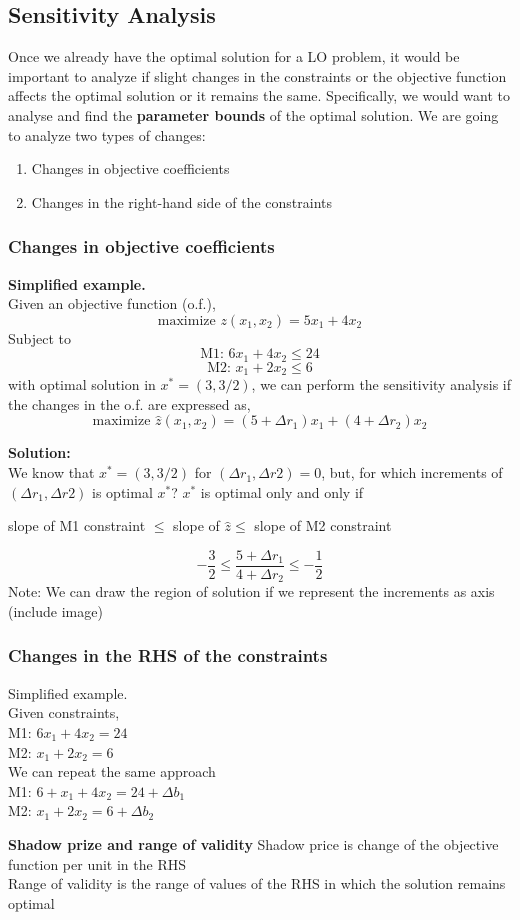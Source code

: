 \subsection{Sensitivity Analysis}
Once we already have the optimal solution for a LO problem, it would be important to analyze if slight changes in the constraints or the objective function
affects the optimal solution or it remains the same. Specifically, we would want to analyse and find the \textbf{parameter bounds} of the optimal solution.
We are going to analyze two types of changes:
\begin{enumerate}
    \item Changes in objective coefficients
    \item Changes in the right-hand side of the constraints    
\end{enumerate}

\subsubsection{Changes in objective coefficients}
\textbf{Simplified example.}\\
Given an objective function (o.f.),
\[ \text{maximize } z(x_1, x_2) = 5x_1 + 4x_2 \]
Subject to
\[ \text{M1: } 6x_1 + 4x_2 \leq 24 \]
\[\text{M2: } x_1 + 2x_2 \leq 6 \]
with optimal solution in $x^* = (3, 3/2)$, we can perform the sensitivity analysis if the changes in the o.f. are expressed as,
\[ \text{maximize } \hat{z}(x_1, x_2) = (5+\Delta r_1)x_1 + (4 + \Delta r_2)x_2 \]

\textbf{Solution:}\\
We know that $x^* = (3, 3/2)$ for $(\Delta r_1, \Delta r2) = 0$, but, for which increments of $(\Delta r_1, \Delta r2)$ is optimal $x^*$?
$x^*$ is optimal only and only if
\begin{center}
    slope of M1 constraint $\leq$ slope of $\hat{z} \leq$ slope of M2 constraint
\end{center} 
\[ -\frac{3}{2} \leq \frac{5 + \Delta r_1}{4 + \Delta r_2} \leq -\frac{1}{2} \]
Note: We can draw the region of solution if we represent the increments as axis (include image)

\subsubsection{Changes in the RHS of the constraints}
Simplified example.\\
Given constraints,\\
M1: $ 6x_1 + 4x_2 = 24 $ \\
M2: $ x_1 + 2x_2 = 6 $\\
We can repeat the same approach\\
M1: $ 6+x_1 + 4x_2 = 24 + \Delta b_1 $\\
M2: $ x_1 + 2x_2 = 6 + \Delta b_2 $

\textbf{Shadow prize and range of validity}
Shadow price is change of the objective function per unit in the RHS\\
Range of validity is the range of values of the RHS in which the solution remains optimal
